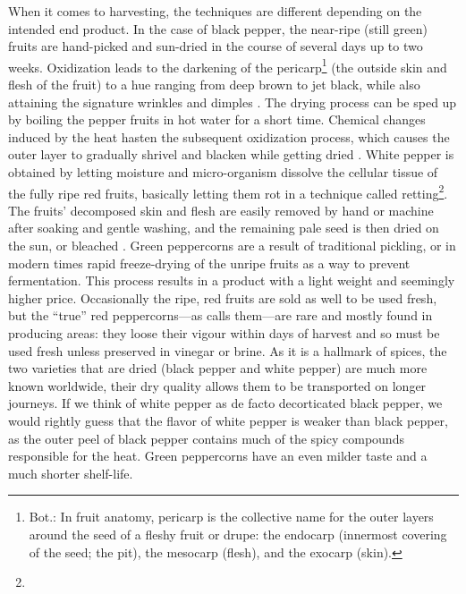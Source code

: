 When it comes to harvesting, the techniques are different depending on the intended end product. In the case of black pepper, the near-ripe (still green) fruits are hand-picked and sun-dried in the course of several days up to two weeks. Oxidization leads to the darkening of the pericarp\footnote{Bot.: In fruit anatomy, pericarp is the collective name for the outer layers around the seed of a fleshy fruit or drupe: the endocarp (innermost covering of the seed; the pit), the mesocarp (flesh), and the exocarp (skin).} (the outside skin and flesh of the fruit) to a hue ranging from deep brown to jet black, while also attaining the signature wrinkles and dimples \autocite[254]{hill_contemporary_2004}. The drying process can be sped up by boiling the pepper fruits in hot water for a short time. Chemical changes induced by the heat hasten the subsequent oxidization process, which causes the outer layer to gradually shrivel and blacken while getting dried \autocite[216]{van_wyk_culinary_2014}. White pepper is obtained by letting moisture and micro-organism dissolve the cellular tissue of the fully ripe red fruits, basically letting them rot in a technique called retting\footnote{}. The fruits' decomposed skin and flesh are easily removed by hand or machine after soaking and gentle washing, and the remaining pale seed is then dried on the sun, or bleached \autocite[216]{van_wyk_culinary_2014}. Green peppercorns are a result of traditional pickling, or in modern times rapid freeze-drying of the unripe fruits as a way to prevent fermentation. This process results in a product with a light weight and seemingly higher price. Occasionally the ripe, red fruits are sold as well to be used fresh, but the ``true'' red peppercorns---as \textcite{hill_contemporary_2004} calls them---are rare and mostly found in producing areas: they loose their vigour within days of harvest and so must be used fresh unless preserved in vinegar or brine. As it is a hallmark of spices, the two varieties that are dried (black pepper and white pepper) are much more known worldwide, their dry quality allows them to be transported on longer journeys. If we think of white pepper as de facto decorticated black pepper, we would rightly guess that the flavor of white pepper is weaker than black pepper, as the outer peel of black pepper contains much of the spicy compounds responsible for the heat. Green peppercorns have an even milder taste and a much shorter shelf-life.
